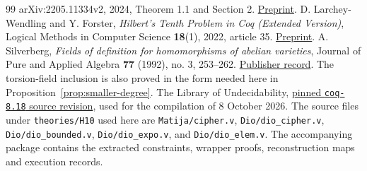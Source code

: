 \documentclass[11pt]{article}
\theoremstyle{definition}
\begin{document}
\begin{thebibliography}{99}
arXiv:2205.11334v2, 2024, Theorem 1.1 and Section 2.
\href{https://arxiv.org/abs/2205.11334}{Preprint}.
 D. Larchey-Wendling and Y. Forster,
\emph{Hilbert's Tenth Problem in Coq (Extended Version)},
Logical Methods in Computer Science \textbf{18}(1), 2022,
article 35. \href{https://arxiv.org/abs/2003.04604}{Preprint}.
 A. Silverberg,
\emph{Fields of definition for homomorphisms of abelian varieties},
Journal of Pure and Applied Algebra \textbf{77} (1992), no. 3,
253--262. \href{https://www.sciencedirect.com/science/article/pii/0022404992901412}{Publisher record}.
The torsion-field inclusion is also proved in the form needed here
in Proposition~\ref{prop:smaller-degree}.
 The Library of Undecidability,
\href{https://github.com/uds-psl/coq-library-undecidability/tree/8880e198bdc44cba1bd901f1fee701a95fc440ae}{pinned \texttt{coq-8.18} source revision},
used for the compilation of 8 October 2026.
The source files under \texttt{theories/H10} used here are
\texttt{Matija/cipher.v}, \texttt{Dio/dio\_cipher.v},
\texttt{Dio/dio\_bounded.v}, \texttt{Dio/dio\_expo.v}, and
\texttt{Dio/dio\_elem.v}. The accompanying package contains the extracted constraints, wrapper
proofs, reconstruction maps and execution records.
\end{thebibliography}
\end{document}
